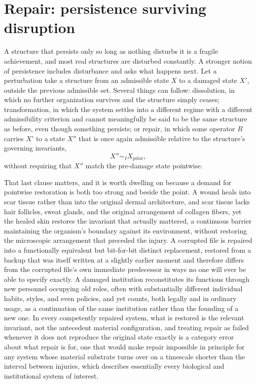 \documentclass[11pt]{article}
\begin{document}
\section{Repair: persistence surviving disruption}

A structure that persists only so long as nothing disturbs it is a fragile achievement, and most real structures are disturbed constantly. A stronger notion of persistence includes disturbance and asks what happens next. Let a perturbation take a structure from an admissible state $X$ to a damaged state $X'$, outside the previous admissible set. Several things can follow: dissolution, in which no further organization survives and the structure simply ceases; transformation, in which the system settles into a different regime with a different admissibility criterion and cannot meaningfully be said to be the same structure as before, even though something persists; or repair, in which some operator $R$ carries $X'$ to a state $X''$ that is once again admissible relative to the structure's governing invariants,
$$X'' \sim_I X_{\text{prior}},$$
without requiring that $X''$ match the pre-damage state pointwise.

That last clause matters, and it is worth dwelling on because a demand for pointwise restoration is both too strong and beside the point. A wound heals into scar tissue rather than into the original dermal architecture, and scar tissue lacks hair follicles, sweat glands, and the original arrangement of collagen fibers, yet the healed skin restores the invariant that actually mattered, a continuous barrier maintaining the organism's boundary against its environment, without restoring the microscopic arrangement that preceded the injury. A corrupted file is repaired into a functionally equivalent but bit-for-bit distinct replacement, restored from a backup that was itself written at a slightly earlier moment and therefore differs from the corrupted file's own immediate predecessor in ways no one will ever be able to specify exactly. A damaged institution reconstitutes its functions through new personnel occupying old roles, often with substantially different individual habits, styles, and even policies, and yet counts, both legally and in ordinary usage, as a continuation of the same institution rather than the founding of a new one. In every competently repaired system, what is restored is the relevant invariant, not the antecedent material configuration, and treating repair as failed whenever it does not reproduce the original state exactly is a category error about what repair is for, one that would make repair impossible in principle for any system whose material substrate turns over on a timescale shorter than the interval between injuries, which describes essentially every biological and institutional system of interest.
\end{document}
